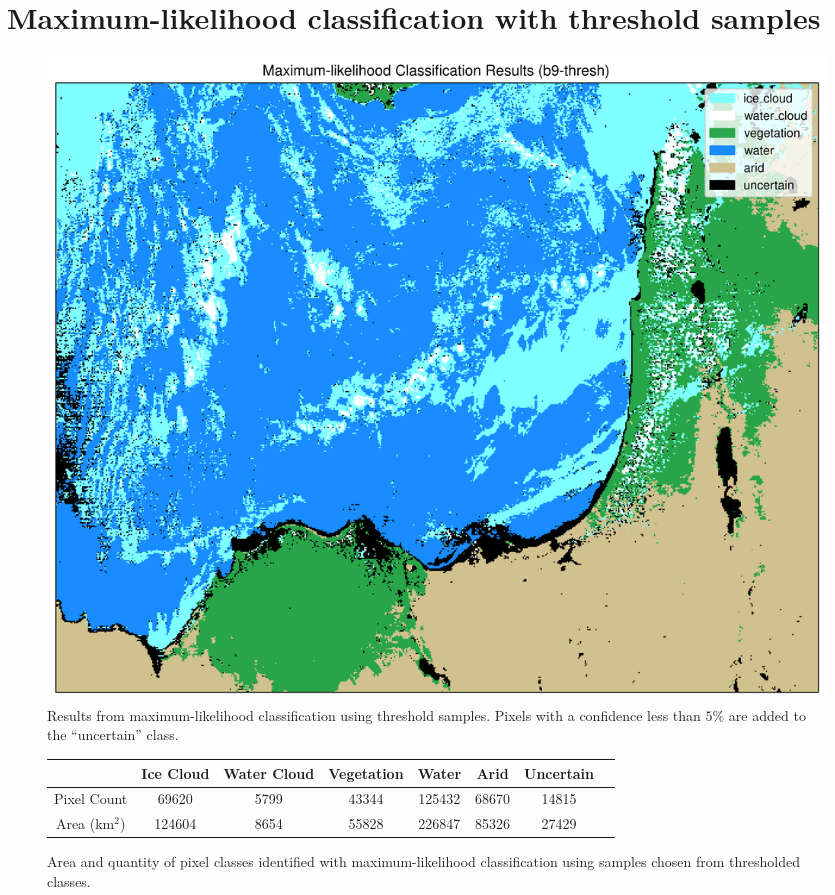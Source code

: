 \documentclass[12pt]{article}
\begin{document}
\clearpage
\section{Maximum-likelihood classification with threshold samples}

\begin{figure}[h!]
    \centering

    \includegraphics[width=.85\textwidth]{figs/class/mlc_b9-thresh_6c.png}

    \caption{Results from maximum-likelihood classification using threshold samples.  Pixels with a confidence less than $5\%$ are added to the ``uncertain'' class. }
    \label{mlc_thresh_results}
\end{figure}

\begin{figure}[h!]
    \centering
    \begin{tabular}{c|ccccccc}
    & Ice Cloud & Water Cloud & Vegetation & Water & Arid & Uncertain\\
    \hline
    Pixel Count & 69620 & 5799 & 43344 & 125432 & 68670 & 14815\\
    Area (km$^2$) & 124604 & 8654 & 55828 & 226847 & 85326 & 27429\\
    \end{tabular}
    \caption{Area and quantity of pixel classes identified with maximum-likelihood classification using samples chosen from thresholded classes.}
    \label{mlc_thresh_areas}
\end{figure}

\clearpage
\end{document}
